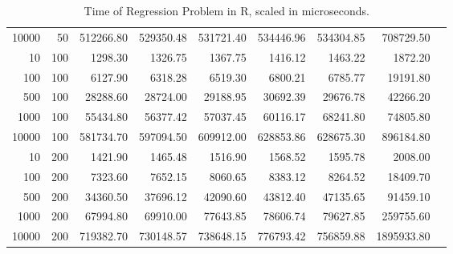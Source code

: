 \begin{table}[ht]
\begin{tabular}{rrrrrrrrr}
  10000 & 50 & 512266.80 & 529350.48 & 531721.40 & 534446.96 & 534304.85 & 708729.50 \\ 
  10 & 100 & 1298.30 & 1326.75 & 1367.75 & 1416.12 & 1463.22 & 1872.20 \\ 
  100 & 100 & 6127.90 & 6318.28 & 6519.30 & 6800.21 & 6785.77 & 19191.80 \\ 
  500 & 100 & 28288.60 & 28724.00 & 29188.95 & 30692.39 & 29676.78 & 42266.20 \\ 
  1000 & 100 & 55434.80 & 56377.42 & 57037.45 & 60116.17 & 68241.80 & 74805.80 \\ 
  10000 & 100 & 581734.70 & 597094.50 & 609912.00 & 628853.86 & 628675.30 & 896184.80 \\ 
  10 & 200 & 1421.90 & 1465.48 & 1516.90 & 1568.52 & 1595.78 & 2008.00 \\ 
  100 & 200 & 7323.60 & 7652.15 & 8060.65 & 8383.12 & 8264.52 & 18409.70 \\ 
  500 & 200 & 34360.50 & 37696.12 & 42090.60 & 43812.40 & 47135.65 & 91459.10 \\ 
  1000 & 200 & 67994.80 & 69910.00 & 77643.85 & 78606.74 & 79627.85 & 259755.60 \\ 
  10000 & 200 & 719382.70 & 730148.57 & 738648.15 & 776793.42 & 756859.88 & 1895933.80 \\
   \hline
\end{tabular}
\caption[Regression Time R]{Time of Regression Problem in R, scaled in microseconds.}
\label{reg:time_r}
\end{table}

\clearpage

